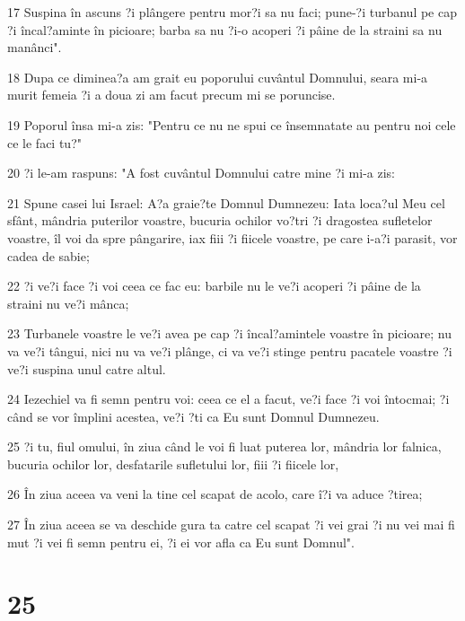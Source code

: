 \par 17 Suspina în ascuns ?i plângere pentru mor?i sa nu faci; pune-?i turbanul pe cap ?i încal?aminte în picioare; barba sa nu ?i-o acoperi ?i pâine de la straini sa nu manânci".
\par 18 Dupa ce diminea?a am grait eu poporului cuvântul Domnului, seara mi-a murit femeia ?i a doua zi am facut precum mi se poruncise.
\par 19 Poporul însa mi-a zis: "Pentru ce nu ne spui ce însemnatate au pentru noi cele ce le faci tu?"
\par 20 ?i le-am raspuns: "A fost cuvântul Domnului catre mine ?i mi-a zis:
\par 21 Spune casei lui Israel: A?a graie?te Domnul Dumnezeu: Iata loca?ul Meu cel sfânt, mândria puterilor voastre, bucuria ochilor vo?tri ?i dragostea sufletelor voastre, îl voi da spre pângarire, iax fiii ?i fiicele voastre, pe care i-a?i parasit, vor cadea de sabie;
\par 22 ?i ve?i face ?i voi ceea ce fac eu: barbile nu le ve?i acoperi ?i pâine de la straini nu ve?i mânca;
\par 23 Turbanele voastre le ve?i avea pe cap ?i încal?amintele voastre în picioare; nu va ve?i tângui, nici nu va ve?i plânge, ci va ve?i stinge pentru pacatele voastre ?i ve?i suspina unul catre altul.
\par 24 Iezechiel va fi semn pentru voi: ceea ce el a facut, ve?i face ?i voi întocmai; ?i când se vor împlini acestea, ve?i ?ti ca Eu sunt Domnul Dumnezeu.
\par 25 ?i tu, fiul omului, în ziua când le voi fi luat puterea lor, mândria lor falnica, bucuria ochilor lor, desfatarile sufletului lor, fiii ?i fiicele lor,
\par 26 În ziua aceea va veni la tine cel scapat de acolo, care î?i va aduce ?tirea;
\par 27 În ziua aceea se va deschide gura ta catre cel scapat ?i vei grai ?i nu vei mai fi mut ?i vei fi semn pentru ei, ?i ei vor afla ca Eu sunt Domnul".

\chapter{25}

